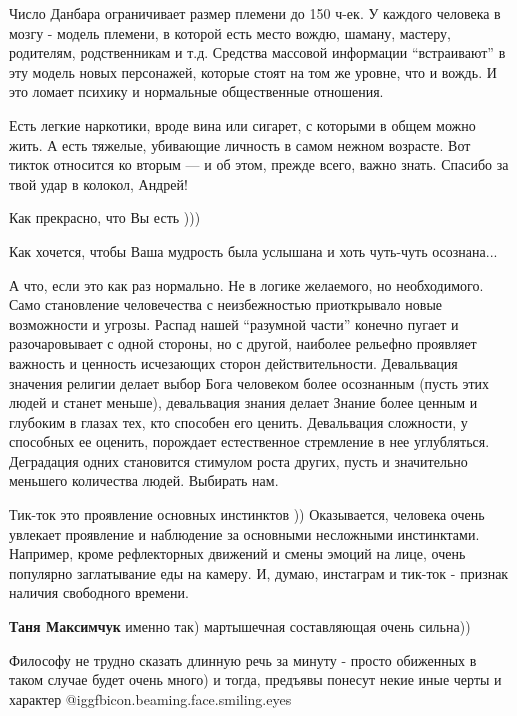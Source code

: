 \begin{itemize}

Число Данбара ограничивает размер племени до 150 ч-ек. У каждого человека в
мозгу - модель племени, в которой есть место вождю, шаману, мастеру, родителям,
родственникам и т.д. Средства массовой информации \enquote{встраивают} в эту модель
новых персонажей, которые стоят на том же уровне, что и вождь. И это ломает
психику и нормальные общественные отношения.


Есть легкие наркотики, вроде вина или сигарет, с которыми в общем можно жить. А
есть тяжелые, убивающие личность в самом нежном возрасте. Вот тикток относится
ко вторым — и об этом, прежде всего, важно знать. Спасибо за твой удар в
колокол, Андрей!

Как прекрасно, что Вы есть )))


Как хочется, чтобы Ваша мудрость была услышана и хоть чуть-чуть осознана...


А что, если это как раз нормально. Не в логике желаемого, но необходимого. Само
становление человечества с неизбежностью приоткрывало новые возможности и
угрозы. Распад нашей \enquote{разумной части} конечно пугает и разочаровывает с одной
стороны, но с другой, наиболее рельефно проявляет важность и ценность
исчезающих сторон действительности. Девальвация значения религии делает выбор
Бога человеком более осознанным (пусть этих людей и станет меньше), девальвация
знания делает Знание более ценным и глубоким в глазах тех, кто способен его
ценить. Девальвация сложности, у способных ее оценить, порождает естественное
стремление в нее углубляться. Деградация одних становится стимулом роста
других, пусть и значительно меньшего количества людей. Выбирать нам.



Тик-ток это проявление основных инстинктов )) Оказывается, человека очень
увлекает проявление и наблюдение за основными несложными инстинктами. Например,
кроме рефлекторных движений и смены эмоций на лице, очень популярно
заглатывание еды на камеру.  И, думаю, инстаграм и тик-ток - признак наличия
свободного времени.

\textbf{Таня Максимчук} именно так) мартышечная составляющая очень сильна))


Философу не трудно сказать длинную речь за минуту - просто обиженных в таком
случае будет очень много) и тогда, предъявы понесут некие иные черты и характер
 @igg{fbicon.beaming.face.smiling.eyes} 



\end{itemize}
